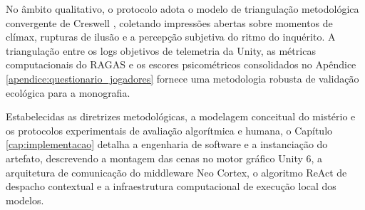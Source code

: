 No âmbito qualitativo, o protocolo adota o modelo de triangulação metodológica convergente de Creswell \cite{creswell2014research}, coletando impressões abertas sobre momentos de clímax, rupturas de ilusão e a percepção subjetiva do ritmo do inquérito. A triangulação entre os logs objetivos de telemetria da Unity, as métricas computacionais do RAGAS e os escores psicométricos consolidados no Apêndice \ref{apendice:questionario_jogadores} fornece uma metodologia robusta de validação ecológica para a monografia.

Estabelecidas as diretrizes metodológicas, a modelagem conceitual do mistério e os protocolos experimentais de avaliação algorítmica e humana, o Capítulo \ref{cap:implementacao} detalha a engenharia de software e a instanciação do artefato, descrevendo a montagem das cenas no motor gráfico Unity 6, a arquitetura de comunicação do middleware Neo Cortex, o algoritmo ReAct de despacho contextual e a infraestrutura computacional de execução local dos modelos.
